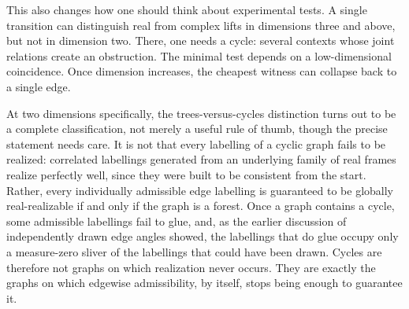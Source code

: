 \documentclass[12pt,openany]{book}
\begin{document}
This also changes how one should think about experimental tests. A single transition can distinguish real from complex lifts in dimensions three and above, but not in dimension two. There, one needs a cycle: several contexts whose joint relations create an obstruction. The minimal test depends on a low-dimensional coincidence. Once dimension increases, the cheapest witness can collapse back to a single edge.

At two dimensions specifically, the trees-versus-cycles distinction turns out to be a complete classification, not merely a useful rule of thumb, though the precise statement needs care. It is not that every labelling of a cyclic graph fails to be realized: correlated labellings generated from an underlying family of real frames realize perfectly well, since they were built to be consistent from the start. Rather, every individually admissible edge labelling is guaranteed to be globally real-realizable if and only if the graph is a forest. Once a graph contains a cycle, some admissible labellings fail to glue, and, as the earlier discussion of independently drawn edge angles showed, the labellings that do glue occupy only a measure-zero sliver of the labellings that could have been drawn. Cycles are therefore not graphs on which realization never occurs. They are exactly the graphs on which edgewise admissibility, by itself, stops being enough to guarantee it.
\end{document}
